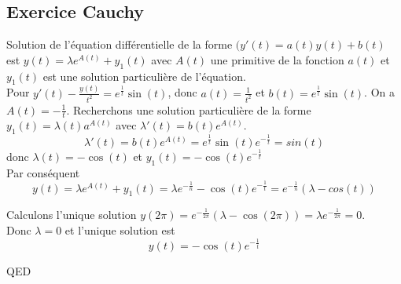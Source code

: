\documentclass[]{book}
\theoremstyle{definition}
\begin{document}
\subsection*{Exercice Cauchy}
Solution de l'\'equation diff\'erentielle de la forme $(y'(t) = a(t)y(t) + b(t)$ est $y(t) = \lambda e^{A(t)}+y_1(t)$ avec $A(t)$ une primitive de la fonction $a(t)$ et $y_1(t)$ est une solution particuli\`ere de l'\'equation.\\

Pour $y'(t) - \frac{y(t)}{t^2} = e^{\frac{1}{t}}\sin(t)$, donc $a(t) = \frac{1}{t^2}$ et $b(t)= e^{\frac{1}{t}}\sin(t)$. On a $A(t) = -\frac{1}{t}$. Recherchons une  solution particuli\`ere de la forme $y_1(t) = \lambda(t)a^{A(t)}$ avec $\lambda'(t) = b(t)e^{A(t)}$.
$$\lambda'(t) = b(t)e^{A(t)} = e^{\frac{1}{t}}\sin(t)e^{-\frac{1}{t}} = sin(t)$$
donc $\lambda(t) =  -\cos(t)$ et $y_1(t) = -\cos(t)e^{-\frac{1}{t}}$\\
Par cons\'equent
$$y(t) = \lambda e^{A(t)}+y_1(t) = \lambda e^{-\frac{1}{n}} -\cos(t)e^{-\frac{1}{t}} = e^{-\frac{1}{n}}(\lambda-cos(t))$$

Calculons l'unique solution $y(2\pi) =  e^{-\frac{1}{2\pi}}(\lambda-\cos(2\pi)) = \lambda e^{-\frac{1}{2\pi}} = 0$.\\
Donc $\lambda = 0$ et l'unique solution est 
$$y(t) = -\cos(t)e^{-\frac{1}{t}}$$


QED
\end{document}
